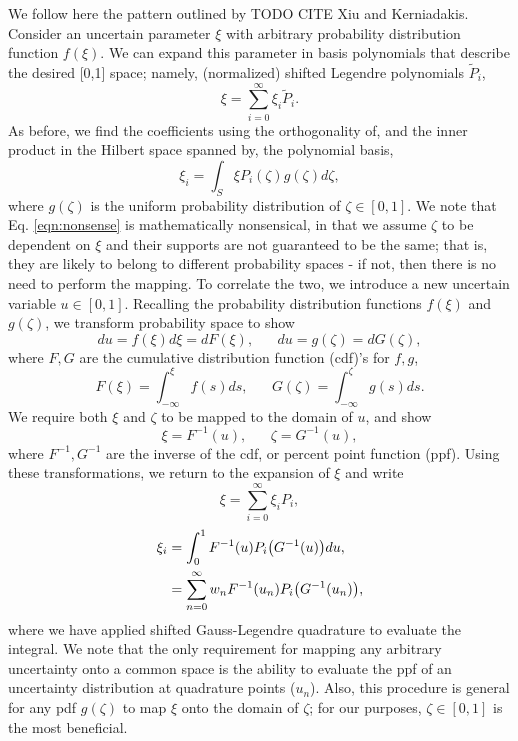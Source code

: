 We follow here the pattern outlined by TODO CITE Xiu and Kerniadakis. Consider an uncertain parameter $\xi$ with arbitrary probability distribution function $f(\xi)$.  We can expand this parameter in basis polynomials that describe the desired [0,1] space; namely, (normalized) shifted Legendre polynomials $\tilde P_i$,
\begin{equation}
\xi=\sum_{i=0}^\infty \xi_i \tilde P_i.
\end{equation}
As before, we find the coefficients using the orthogonality of, and the inner product in the Hilbert space spanned by, the polynomial basis,
\begin{equation}\label{eqn:nonsense}
\xi_i=\int_S \xi P_i(\zeta)g(\zeta)d\zeta,
\end{equation}
where $g(\zeta)$ is the uniform probability distribution of $\zeta\in [0,1]$. 
We note that Eq. \eqref{eqn:nonsense} is mathematically nonsensical, in that we assume $\zeta$ to be dependent on $\xi$ and their supports are not guaranteed to be the same; that is, they are likely to belong to different probability spaces - if not, then there is no need to perform the mapping.  To correlate the two, we introduce a new uncertain variable $u\in [0,1]$.  Recalling the probability distribution functions $f(\xi)$ and $g(\zeta)$, we transform probability space to show
\begin{equation}
du=f(\xi)d\xi=dF(\xi),\hspace{20pt}du=g(\zeta)=dG(\zeta),
\end{equation}
where $F,G$ are the cumulative distribution function (cdf)'s for $f,g$,
\begin{equation}
F(\xi)=\int_{-\infty}^{\xi}f(s)ds,\hspace{20pt}G(\zeta)=\int_{-\infty}^{\zeta}g(s)ds.
\end{equation}
We require both $\xi$ and $\zeta$ to be mapped to the domain of $u$, and show
\begin{equation}
\xi=F^{-1}(u),\hspace{20pt}\zeta=G^{-1}(u),
\end{equation}
where $F^{-1},G^{-1}$ are the inverse of the cdf, or percent point function (ppf).  Using these transformations, we return to the expansion of $\xi$ and write
\begin{equation}
\xi=\sum_{i=0}^\infty \xi_i P_i,
\end{equation}
\begin{align}
\xi_i&=\int_0^1 F^{-1}(u)P_i\big(G^{-1}(u)\big)du,\\
  &=\sum_{n=0}^\infty w_n F^{-1}(u_n)P_i\big(G^{-1}(u_n)\big),
\end{align}
where we have applied shifted Gauss-Legendre quadrature to evaluate the integral.  We note that the only requirement for mapping any arbitrary uncertainty onto a common space is the ability to evaluate the ppf of an uncertainty distribution at quadrature points ($u_n$).  Also, this procedure is general for any pdf $g(\zeta)$ to map $\xi$ onto the domain of $\zeta$; for our purposes, $\zeta\in[0,1]$ is the most beneficial.



